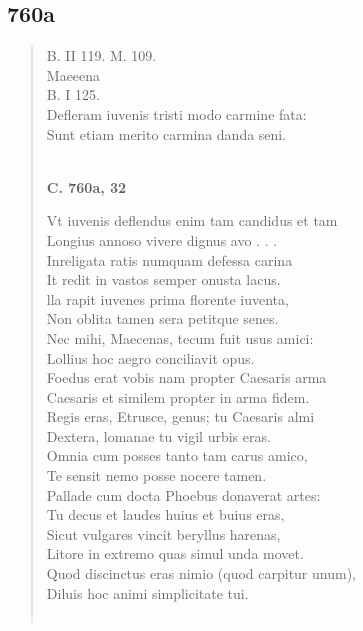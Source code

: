 \documentclass[11pt, a4paper]{report}
\begin{document}
            \subsection*{760a}
      \begin{verse}
      B. II 119. M. 109. \\ Maeeena \\ B. I 125. \\ Defleram iuvenis tristi modo carmine fata: \\ Sunt etiam merito carmina danda seni. \\ 
        ﻿\pagebreak 
    \begin{center} \textbf{C. 760a, 32} \end{center} \marginpar{[236]}  \marginpar{[0]} Vt iuvenis deflendus enim tam candidus et tam \\ Longius annoso vivere dignus avo . . . \\ Inreligata ratis numquam defessa carina \\ It redit in vastos semper onusta lacus. \\ lla rapit iuvenes prima florente iuventa, \\ Non oblita tamen sera petitque senes. \\ Nec mihi, Maecenas, tecum fuit usus amici: \\ Lollius hoc aegro conciliavit opus. \\ Foedus erat vobis nam propter Caesaris arma \\ Caesaris et similem propter in arma fidem. \\ Regis eras, Etrusce, genus; tu Caesaris almi \\ Dextera, lomanae tu vigil urbis eras. \\ Omnia cum posses tanto tam carus amico, \\ Te sensit nemo posse nocere tamen. \\ Pallade cum docta Phoebus donaverat artes: \\ Tu decus et laudes huius et buius eras, \\ Sicut vulgares vincit beryllus harenas, \\ Litore in extremo quas simul unda movet. \\ Quod discinctus eras nimio (quod carpitur unum), \\ Diluis hoc animi simplicitate tui. \\ 
        ﻿\pagebreak 

\end{verse}
\end{document}
